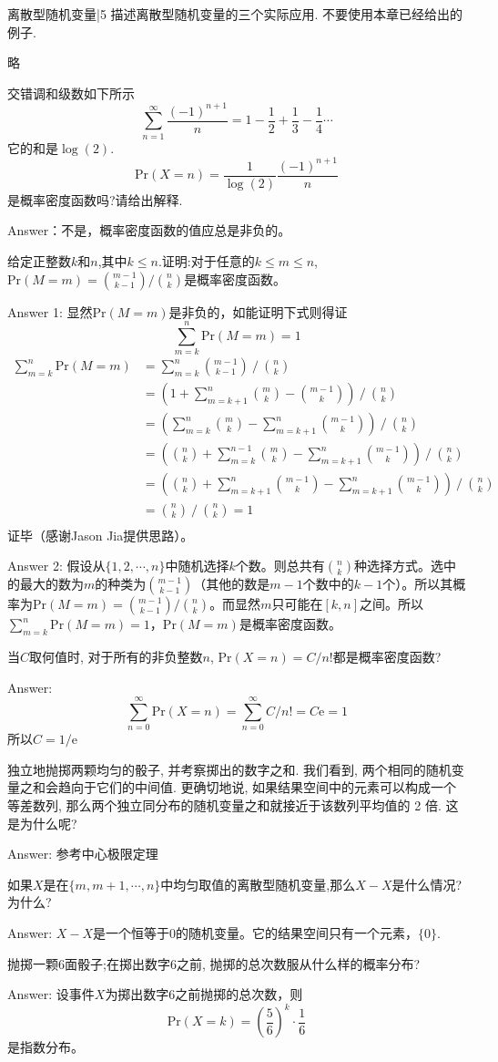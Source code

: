 \newChapter 离散型随机变量|5
\exer 描述离散型随机变量的三个实际应用. 不要使用本章已经给出的例子.\par
略

\exer 交错调和级数如下所示
\[\sum_{n=1}^\infty\frac{(-1)^{n+1}}{n}=1-\frac{1}{2}+\frac{1}{3}-\frac{1}{4}\cdots\]
它的和是$\log(2)$.
\[\mathrm{Pr}(X=n)=\frac{1}{\log(2)}\frac{(-1)^{n+1}}{n}\]
是概率密度函数吗?请给出解释.\par
Answer：不是，概率密度函数的值应总是非负的。

\exer 给定正整数$k$和$n$,其中$k\le n$.证明:对于任意的$k\le m\le n$,$\mathrm{Pr}(M=m)=\binom{m-1}{k-1}/\binom{n}{k}$是概率密度函数。\par
Answer 1: 显然$\mathrm{Pr}(M=m)$是非负的，如能证明下式则得证
\[\sum_{m=k}^n \mathrm{Pr}(M=m)=1\]
\begin{align*}
\sum_{m=k}^n \mathrm{Pr}(M=m) &= \sum_{m=k}^n\binom{m-1}{k-1}\mathrel{/}\binom{n}{k} \\
&=\left(1 + \sum_{m=k+1}^n\binom{m}{k} - \binom{m-1}{k}\right)\mathrel{/}\binom{n}{k} \\
&=\left(\sum_{m=k}^n\binom{m}{k} - \sum_{m=k+1}^n\binom{m-1}{k}\right)\mathrel{/}\binom{n}{k} \\
&=\left(\binom{n}{k} + \sum_{m=k}^{n-1}\binom{m}{k} - \sum_{m=k+1}^n\binom{m-1}{k}\right)\mathrel{/}\binom{n}{k} \\
&=\left(\binom{n}{k} + \sum_{m=k+1}^{n}\binom{m-1}{k} - \sum_{m=k+1}^n\binom{m-1}{k}\right)\mathrel{/}\binom{n}{k} \\
&=\binom{n}{k}\mathrel{/}\binom{n}{k}=1 \\
\end{align*}
证毕（感谢Jason Jia提供思路）。\par
Answer 2: 假设从$\{1,2,\cdots, n\}$中随机选择$k$个数。则总共有$\binom{n}{k}$种选择方式。选中的最大的数为$m$的种类为$\binom{m-1}{k-1}$（其他的数是$m-1$个数中的$k-1$个）。所以其概率为$\mathrm{Pr}(M=m)=\binom{m-1}{k-1}/\binom{n}{k}$。而显然$m$只可能在$[k, n]$之间。所以$\sum_{m=k}^n \mathrm{Pr}(M=m)=1$，$\mathrm{Pr}(M=m)$是概率密度函数。

\exer 当$C$取何值时, 对于所有的非负整数$n$, $\mathrm{Pr}(X = n) = C/n!$都是概率密度函数?\par
Answer: 
\[\sum_{n=0}^\infty\mathrm{Pr}(X=n)=\sum_{n=0}^\infty C/n! = C\mathrm{e} = 1 \]
所以$C=1/\mathrm{e}$

\exer 独立地抛掷两颗均匀的骰子, 并考察掷出的数字之和. 我们看到, 两个相同的随机变量之和会趋向于它们的中间值. 更确切地说, 如果结果空间中的元素可以构成一个等差数列, 那么两个独立同分布的随机变量之和就接近于该数列平均值的 2 倍. 这是为什么呢?\par
Answer: 参考中心极限定理

\exer 如果$X$是在$\{m,m+1,\cdots ,n\}$中均匀取值的离散型随机变量,那么$X-X$是什么情况?为什么?\par
Answer: $X-X$是一个恒等于0的随机变量。它的结果空间只有一个元素，$\{0\}$.

\exer 抛掷一颗6面骰子;在掷出数字6之前, 抛掷的总次数服从什么样的概率分布?\par
Answer: 设事件$X$为掷出数字6之前抛掷的总次数，则
\[\mathrm{Pr}(X=k)=\left(\frac{5}{6}\right)^k\cdot\frac{1}{6}\]
是指数分布。